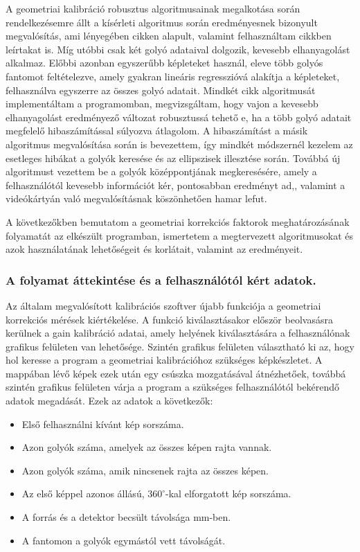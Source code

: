 \documentclass[a4paper,12pt]{article}
\begin{document}
A geometriai kalibráció robusztus algoritmusainak megalkotása során rendelkezésemre állt a kísérleti algoritmus során eredményesnek bizonyult megvalósítás\cite{botond}, ami lényegében  cikken alapult,  valamint felhasználtam   cikkben leírtakat is. Míg utóbbi csak két golyó adataival dolgozik, kevesebb elhanyagolást alkalmaz. Előbbi azonban egyszerűbb képleteket használ, eleve több golyós fantomot feltételezve, amely gyakran lineáris regresszióvá alakítja a képleteket, felhasználva egyszerre az összes golyó adatait. Mindkét cikk algoritmusát implementáltam a programomban, megvizsgáltam, hogy vajon a kevesebb elhanyagolást eredményező változat robusztussá tehető e, ha a több golyó adatait megfelelő hibaszámítással súlyozva átlagolom. A hibaszámítást a másik algoritmus megvalósítása során is bevezettem, így mindkét módszernél kezelem az esetleges hibákat a golyók keresése és az ellipszisek illesztése során. Továbbá új algoritmust vezettem be a golyók középpontjának megkeresésére, amely a felhasználótól kevesebb információt kér, pontosabban eredményt ad,, valamint a videókártyán való megvalósításnak köszönhetően hamar lefut.

A következőkben bemutatom a geometriai korrekciós faktorok meghatározásának folyamatát az elkészült programban, ismertetem a  megtervezett algoritmusokat és azok használatának lehetőségeit és korlátait, valamint az eredményeit.


\subsubsection{ A folyamat áttekintése és a felhasználótól kért adatok. }


Az általam megvalósított kalibrációs szoftver újabb funkciója a geometriai korrekciós mérések kiértékelése. A funkció kiválasztásakor először beolvasásra kerülnek a gain kalibráció adatai, amely helyének kiválasztására a felhasználónak grafikus felületen van lehetősége. Szintén grafikus felületen választható ki az, hogy hol keresse a program a geometriai kalibrációhoz szükséges képkészletet. A mappában lévő képek ezek után egy csúszka mozgatásával átnézhetőek, továbbá szintén grafikus felületen várja a program a szükséges felhasználótól bekérendő adatok megadását. Ezek az adatok a következők:

\begin{itemize}
  \item Első felhasználni kívánt kép sorszáma.
  \item Azon golyók száma, amelyek az összes képen rajta vannak.
  \item Azon golyók száma, amik nincsenek rajta az összes képen.
  \item Az első képpel azonos állású, $360^\circ$-kal elforgatott kép sorszáma.
  \item A forrás és a detektor becsült távolsága mm-ben.
    \item A fantomon a golyók egymástól vett távolságát.
\end{itemize}
\end{document}
